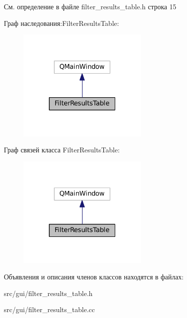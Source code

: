 См. определение в файле filter\+\_\+results\+\_\+table.\+h строка 15



Граф наследования\+:Filter\+Results\+Table\+:\nopagebreak
\begin{figure}[H]
\begin{center}
\leavevmode
\includegraphics[width=181pt]{class_filter_results_table__inherit__graph}
\end{center}
\end{figure}


Граф связей класса Filter\+Results\+Table\+:\nopagebreak
\begin{figure}[H]
\begin{center}
\leavevmode
\includegraphics[width=181pt]{class_filter_results_table__coll__graph}
\end{center}
\end{figure}


Объявления и описания членов классов находятся в файлах\+:\begin{DoxyCompactItemize}
\item 
src/gui/filter\+\_\+results\+\_\+table.\+h\item 
src/gui/filter\+\_\+results\+\_\+table.\+cc\end{DoxyCompactItemize}
